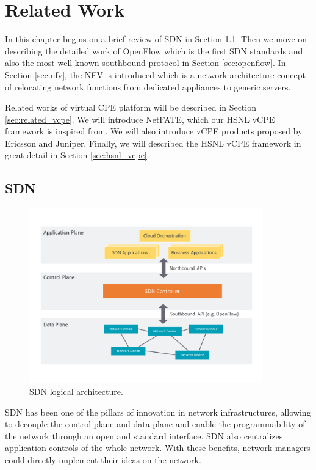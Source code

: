 \chapter{Related Work} \label{ch:related_work}

In this chapter begins on a brief review of SDN in Section \ref{sec:sdn}.
Then we move on describing the detailed work of OpenFlow which is the first SDN standards and also the most well-known southbound protocol in Section \ref{sec:openflow}.
In Section \ref{sec:nfv}, the NFV is introduced which is a network architecture concept of relocating network functions from dedicated appliances to generic servers.

Related works of virtual CPE platform will be described in Section \ref{sec:related_vcpe}.
We will introduce NetFATE, which our HSNL vCPE framework is inspired from. We will also introduce vCPE products proposed by Ericsson and Juniper.
Finally, we will described the HSNL vCPE framework in great detail in Section \ref{sec:hsnl_vcpe}.





\section{SDN} \label{sec:sdn}

\begin{figure}[!t]
\centering
\includegraphics[width=0.9\textwidth]{./fig/sdn_architecture}
\caption{SDN logical architecture.}
\label{fig:sdn_archi}
\end{figure}

SDN has been one of the pillars of innovation in network infrastructures, allowing to decouple the control plane and data plane and enable the programmability of the network through an open and standard interface\cite{sdn-define}.
SDN also centralizes application controls of the whole network.
With these benefits, network managers could directly implement their ideas on the network.


